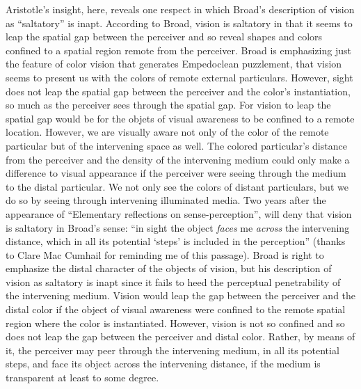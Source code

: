 \documentclass[12pt]{article}
\begin{document}
Aristotle's insight, here, reveals one respect in which Broad's \citeyearpar{Broad:1952kx} description of vision as ``saltatory'' is inapt. According to Broad, vision is saltatory in that it seems to leap the spatial gap between the perceiver and so reveal shapes and colors confined to a spatial region remote from the perceiver. Broad is emphasizing just the feature of color vision that generates Empedoclean puzzlement, that vision seems to present us with the colors of remote external particulars. However, sight does not leap the spatial gap between the perceiver and the color's instantiation, so much as the perceiver sees through the spatial gap. For vision to leap the spatial gap would be for the objets of visual awareness to be confined to a remote location. However, we are visually aware not only of the color of the remote particular but of the intervening space as well. The colored particular's distance from the perceiver and the density of the intervening medium could only make a difference to visual appearance if the perceiver were seeing through the medium to the distal particular. We not only see the colors of distant particulars, but we do so by seeing through intervening illuminated media. Two years after the appearance of ``Elementary reflections on sense-perception'', \citet[518]{Jonas:1954aa} will deny that vision is saltatory in Broad's sense: ``in sight the object \emph{faces} me \emph{across} the intervening distance, which in all its potential `steps' is included in the perception'' (thanks to Clare Mac Cumhail for reminding me of this passage). Broad is right to emphasize the distal character of the objects of vision, but his description of vision as saltatory is inapt since it fails to heed the perceptual penetrability of the intervening medium. Vision would leap the gap between the perceiver and the distal color if the object of visual awareness were confined to the remote spatial region where the color is instantiated. However, vision is not so confined and so does not leap the gap between the perceiver and distal color. Rather, by means of it, the perceiver may peer through the intervening medium, in all its potential steps, and face its object across the intervening distance, if the medium is transparent at least to some degree.
\end{document}
